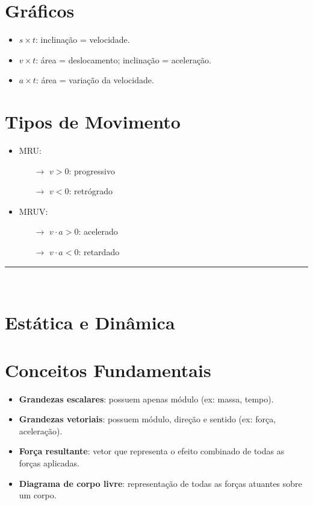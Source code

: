 \documentclass[a4paper,12pt]{article}
\begin{document}
\begin{multicols}{2}
\section{Gráficos}
\begin{itemize}
  \item $s \times t$: inclinação = velocidade.
  \item $v \times t$: área = deslocamento; inclinação = aceleração.
  \item $a \times t$: área = variação da velocidade.
\end{itemize}

\section{Tipos de Movimento}
\begin{itemize}
  \item MRU:
    \begin{itemize}
      \item[$\rightarrow$] $v > 0$: progressivo
      \item[$\rightarrow$] $v < 0$: retrógrado
    \end{itemize}
  \item MRUV:
    \begin{itemize}
      \item[$\rightarrow$] $v \cdot a > 0$: acelerado
      \item[$\rightarrow$] $v \cdot a < 0$: retardado
    \end{itemize}
\end{itemize}

\noindent\rule{\linewidth}{1pt}\\
\section{Estática e Dinâmica}

\section{Conceitos Fundamentais}

\begin{itemize}
  \item \textbf{Grandezas escalares}: possuem apenas módulo (ex: massa, tempo).
  \item \textbf{Grandezas vetoriais}: possuem módulo, direção e sentido (ex: força, aceleração).
  \item \textbf{Força resultante}: vetor que representa o efeito combinado de todas as forças aplicadas.
  \item \textbf{Diagrama de corpo livre}: representação de todas as forças atuantes sobre um corpo.
\end{itemize}


\end{multicols}
\end{document}
